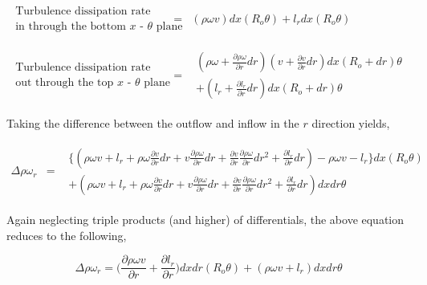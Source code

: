 \begin{displaymath}
	\begin{array}{ccc}
		\begin{array}{c}
			\textrm{Turbulence dissipation rate} \\ \textrm{in through the bottom $x$ - $\theta$ plane} 
		\end{array} & 
	= & (\rho \omega v)dx(R_o \theta) + l_r dx(R_o \theta)\\
	& \\ & \\
		\begin{array}{c}
			\textrm{Turbulence dissipation rate} \\ \textrm{out through the top $x$ - $\theta$ plane}
		\end{array} & 
	= & \begin{array}{c}
		(\rho \omega + \frac{\partial \rho \omega}{\partial r}dr)(v + \frac{\partial v}{\partial r}dr)dx
		(R_o + dr) \theta  \\
	+ (l_r + \frac{\partial l_r}{\partial r}dr)dx (R_o + dr) \theta
		\end{array}
	\end{array}
\end{displaymath}

	Taking the difference between the outflow and inflow in the $r$ direction yields,

\begin{displaymath}
	\begin{array}{ccc}
	\Delta \rho \omega_r & = &
		\begin{array}{c} 
	\Big\{(\rho \omega v + l_r + \rho \omega \frac{\partial v}{\partial r}dr + v \frac{\partial \rho \omega}
	{\partial r}dr + \frac{\partial v}{\partial r} \frac{\partial \rho \omega}{\partial r}dr^2 + \frac{\partial l_r}
	{\partial r}dr) -\rho \omega v - l_r\Big\} dx(R_o \theta) \\
	+ (\rho \omega v + l_r + \rho \omega \frac{\partial v}{\partial r}dr + v \frac{\partial \rho \omega}
	{\partial r}dr + \frac{\partial v}{\partial r} \frac{\partial \rho \omega}{\partial r}dr^2 + \frac{\partial l_r}
	{\partial r}dr) dx dr \theta
		\end{array}
	\end{array}
\end{displaymath}

	Again neglecting triple products (and higher) of differentials, the above equation reduces to the following,

\begin{displaymath}
	\Delta \rho \omega_r = \Big( \frac{\partial \rho \omega v}{\partial r} + \frac{\partial l_r}{\partial r}
	\Big)dxdr(R_o \theta) + (\rho \omega v + l_r)dxdr\theta
\end{displaymath}


